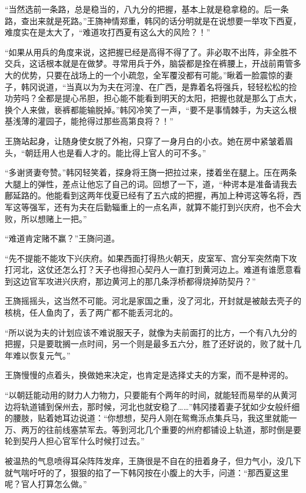 “当然选前一条路，总是稳当的，八九分的把握，基本上就是稳拿稳的。后一条路，查出来就是死路。”王旖神情郑重，韩冈的话分明就是在说想要一举攻下西夏，难度实在是太大了，“难道攻打西夏有这么大的风险？！”

“如果从用兵的角度来说，这把握已经是高得不得了了。非必取不出阵，非全胜不交兵，这话根本就是在做梦。寻常用兵于外，脑袋都是拴在裤腰上，开战前甭管多大的优势，只要在战场上的一个小疏忽，全军覆没都有可能。”瞅着一脸震惊的妻子，韩冈说道，“当真以为为夫在河湟、在广西，是靠着名将强兵，轻轻松松的捡功劳吗？全都是提心吊胆，担心能不能看到明天的太阳，把握也就是那么丁点大，换个人来做，亵裤都能输脱掉。”韩冈冷笑了一声，“要不是事情棘手，为夫这么根基浅薄的灌园子，能抢得过那些高第良将？！”

王旖站起身，让随身使女脱了外袍，只穿了一身月白的小衣。她在房中紧皱着眉头，“朝廷用人也是看人才的。能比得上官人的可不多。”

“多谢贤妻夸赞。”韩冈轻笑着，探身将王旖一把拉过来，搂着坐在腿上。压在两条大腿上的弹性，差点让他忘了自己的词。回想了一下，道，“种谔本是准备请我去鄜延路的。他能看到这两年伐夏已经有了五六成的把握，再加上种谔这等名将，西军这等强军，还有为夫在后勤辎重上的一点名声，就算不能打到兴庆府，也不会大败，所以想赌上一把。”

“难道肯定赌不赢？”王旖问道。

“先不提能不能攻下兴庆府。如果西面打得热火朝天，皮室军、宫分军突然南下攻打河北，这仗还怎么打？天子也得担心契丹人一直打到黄河边上。难道有谁愿意看到这边官军攻进兴庆府，那边黄河上的那几条浮桥都得烧掉防契丹？”

王旖摇摇头，这当然不可能。河北是家国之重，没了河北，开封就是被敲去壳子的核桃，任人鱼肉了，丢了两广都不能丢河北的。

“所以说为夫的计划应该不难说服天子，就像为夫前面打的比方，一个有八九分的把握，只是要耽搁一点时间，另一个则是最多五六分，胜了还好说的，败了就十几年难以恢复元气。”

王旖慢慢的点着头，换做她来决定，也肯定是选择丈夫的方案，而不是种谔的。

“以朝廷能动用的财力人力物力，只要能有个两年的时间，就能轻而易举的从黄河边将轨道铺到保州去，那时候，河北也就安稳了……”韩冈搂着妻子犹如少女般纤细的腰肢，贴着她耳边说道：“你想想，契丹人刚在鸳鸯泺点集兵马，我这里就能一万、两万的往前线塞禁军去。等到河北几个重要的州府都铺设上轨道，那时倒是要轮到契丹人担心官军什么时候打过去。”

被温热的气息喷得耳朵阵阵发痒，王旖很是不自在的扭着身子，但力气小，没几下就气喘吁吁的了，狠狠的掐了一下韩冈按在小腹上的大手，问道：“那西夏这里呢？官人打算怎么做。”

